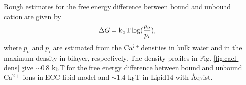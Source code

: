 \documentclass[aip,jcp,twocolumn]{revtex4}
\begin{document}
Rough estimates for the free energy difference between bound and unbound cation
are given by
\begin{equation}
  \Delta G={\rm k_b T}\log(\frac{p_o}{p_i}),
\end{equation}
where $p_o$ and $p_i$ are estimated from the Ca$^{2+}$densities in bulk water and
in the maximum density in bilayer, respectively. The density profiles in
Fig. \ref{fig:cacl-dens} give $\sim 0.8$ k$_{\rm b}$T for the free energy difference
between bound and unbound Ca$^{2+}$ ions in ECC-lipid model and $\sim 1.4$ k$_{\rm b}$T
in Lipid14 with \AA{}qvist.

\end{document}
